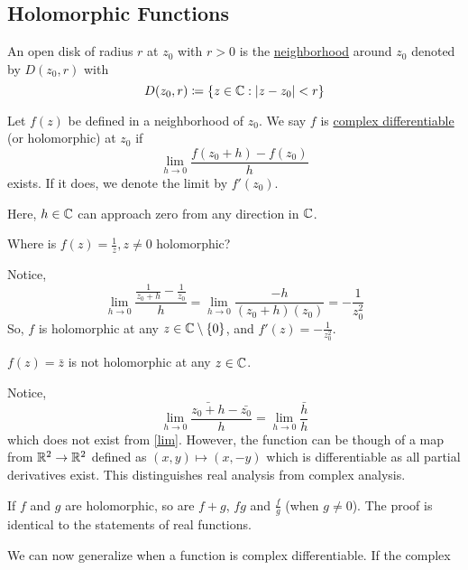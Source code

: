 \documentclass[11pt]{article}
\begin{document}
\subsection{Holomorphic Functions}
\begin{definition}
An open disk of radius $r$ at $z_0$ with $r>0$ is the \underline{neighborhood}
around $z_0$ denoted by $D(z_0, r)$ with
\begin{equation*}
D(z_0, r) \coloneqq \{z\in\mathbb{C}:|z-z_0|<r\}
\end{equation*}
\end{definition}
\begin{definition}
Let $f(z)$ be defined in a neighborhood of $z_0$. We say $f$ is
\underline{complex differentiable} (or holomorphic) at $z_0$ if
\begin{equation*}
\lim_{h\to 0} \frac{f(z_0+h) - f(z_0)}{h}
\end{equation*}
exists. If it does, we denote the limit by $f'(z_0)$.
\end{definition}
\begin{remark}
Here, $h\in\mathbb{C}$ can approach zero from any direction in $\mathbb{C}$.
\end{remark}
\begin{example}
Where is $f(z) = \frac{1}{z}, z \neq 0$ holomorphic?
\end{example}
Notice,
\begin{equation*}
\lim_{h\to 0} \frac{\frac{1}{z_0+h} - \frac{1}{z_0}}{h}
= \lim_{h\to 0} \frac{-h}{(z_0+h)(z_0)}
= -\frac{1}{z_0^2}
\end{equation*}
So, $f$ is holomorphic at any $z \in \mathbb{C} \setminus \{0\}$, and $f'(z) =
-\frac{1}{z_0^2}$.
\begin{example}
$f(z) = \bar z$ is not holomorphic at any $z \in \mathbb{C}$.
\end{example}
Notice,
\begin{equation*}
\lim_{h\to 0} \frac{\bar{z_0 + h} - \bar{z_0}}{h}
= \lim_{h \to 0} \frac{\bar h}{h}
\end{equation*}
which does not exist from \cref{lim}. However, the function can be though of a
map from $\mathbb{R}^2 \to \mathbb{R}^2$ defined as $(x,y) \mapsto (x,-y)$ which is
differentiable as all partial derivatives exist. This distinguishes real
analysis from complex analysis.
\begin{remark}
If $f$ and $g$ are holomorphic, so are $f+g$, $fg$ and $\frac{f}{g}$ (when
$g\neq 0$). The proof is identical to the statements of real functions.
\end{remark}
\sectionline
We can now generalize when a function is complex differentiable. If the complex
\end{document}
